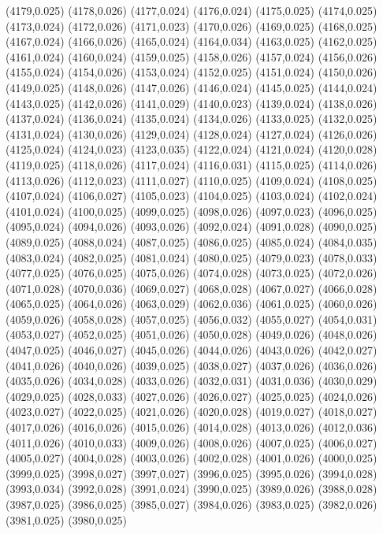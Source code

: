 (4179,0.025)
(4178,0.026)
(4177,0.024)
(4176,0.024)
(4175,0.025)
(4174,0.025)
(4173,0.024)
(4172,0.026)
(4171,0.023)
(4170,0.026)
(4169,0.025)
(4168,0.025)
(4167,0.024)
(4166,0.026)
(4165,0.024)
(4164,0.034)
(4163,0.025)
(4162,0.025)
(4161,0.024)
(4160,0.024)
(4159,0.025)
(4158,0.026)
(4157,0.024)
(4156,0.026)
(4155,0.024)
(4154,0.026)
(4153,0.024)
(4152,0.025)
(4151,0.024)
(4150,0.026)
(4149,0.025)
(4148,0.026)
(4147,0.026)
(4146,0.024)
(4145,0.025)
(4144,0.024)
(4143,0.025)
(4142,0.026)
(4141,0.029)
(4140,0.023)
(4139,0.024)
(4138,0.026)
(4137,0.024)
(4136,0.024)
(4135,0.024)
(4134,0.026)
(4133,0.025)
(4132,0.025)
(4131,0.024)
(4130,0.026)
(4129,0.024)
(4128,0.024)
(4127,0.024)
(4126,0.026)
(4125,0.024)
(4124,0.023)
(4123,0.035)
(4122,0.024)
(4121,0.024)
(4120,0.028)
(4119,0.025)
(4118,0.026)
(4117,0.024)
(4116,0.031)
(4115,0.025)
(4114,0.026)
(4113,0.026)
(4112,0.023)
(4111,0.027)
(4110,0.025)
(4109,0.024)
(4108,0.025)
(4107,0.024)
(4106,0.027)
(4105,0.023)
(4104,0.025)
(4103,0.024)
(4102,0.024)
(4101,0.024)
(4100,0.025)
(4099,0.025)
(4098,0.026)
(4097,0.023)
(4096,0.025)
(4095,0.024)
(4094,0.026)
(4093,0.026)
(4092,0.024)
(4091,0.028)
(4090,0.025)
(4089,0.025)
(4088,0.024)
(4087,0.025)
(4086,0.025)
(4085,0.024)
(4084,0.035)
(4083,0.024)
(4082,0.025)
(4081,0.024)
(4080,0.025)
(4079,0.023)
(4078,0.033)
(4077,0.025)
(4076,0.025)
(4075,0.026)
(4074,0.028)
(4073,0.025)
(4072,0.026)
(4071,0.028)
(4070,0.036)
(4069,0.027)
(4068,0.028)
(4067,0.027)
(4066,0.028)
(4065,0.025)
(4064,0.026)
(4063,0.029)
(4062,0.036)
(4061,0.025)
(4060,0.026)
(4059,0.026)
(4058,0.028)
(4057,0.025)
(4056,0.032)
(4055,0.027)
(4054,0.031)
(4053,0.027)
(4052,0.025)
(4051,0.026)
(4050,0.028)
(4049,0.026)
(4048,0.026)
(4047,0.025)
(4046,0.027)
(4045,0.026)
(4044,0.026)
(4043,0.026)
(4042,0.027)
(4041,0.026)
(4040,0.026)
(4039,0.025)
(4038,0.027)
(4037,0.026)
(4036,0.026)
(4035,0.026)
(4034,0.028)
(4033,0.026)
(4032,0.031)
(4031,0.036)
(4030,0.029)
(4029,0.025)
(4028,0.033)
(4027,0.026)
(4026,0.027)
(4025,0.025)
(4024,0.026)
(4023,0.027)
(4022,0.025)
(4021,0.026)
(4020,0.028)
(4019,0.027)
(4018,0.027)
(4017,0.026)
(4016,0.026)
(4015,0.026)
(4014,0.028)
(4013,0.026)
(4012,0.036)
(4011,0.026)
(4010,0.033)
(4009,0.026)
(4008,0.026)
(4007,0.025)
(4006,0.027)
(4005,0.027)
(4004,0.028)
(4003,0.026)
(4002,0.028)
(4001,0.026)
(4000,0.025)
(3999,0.025)
(3998,0.027)
(3997,0.027)
(3996,0.025)
(3995,0.026)
(3994,0.028)
(3993,0.034)
(3992,0.028)
(3991,0.024)
(3990,0.025)
(3989,0.026)
(3988,0.028)
(3987,0.025)
(3986,0.025)
(3985,0.027)
(3984,0.026)
(3983,0.025)
(3982,0.026)
(3981,0.025)
(3980,0.025)
